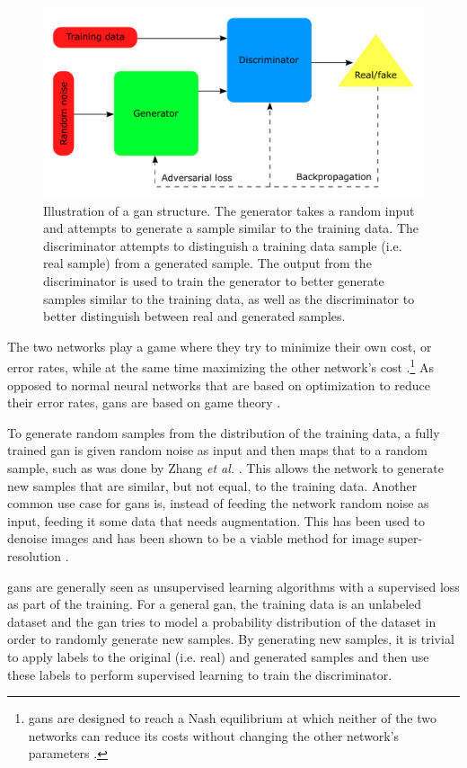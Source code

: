 \begin{figure}[htbp]  
    \centering
    \includegraphics[width=.8\textwidth]{figures/gan.pdf}
    \caption[Illustration of a GAN structure]{Illustration of a \gls{gan} structure. The generator takes a random input and attempts to generate a sample similar to the training data. The discriminator attempts to distinguish a training data sample (i.e. real sample) from a generated sample. The output from the discriminator is used to train the generator to better generate samples similar to the training data, as well as the discriminator to better distinguish between real and generated samples. }
    \label{fig:gan}
\end{figure}

The two networks play a game where they try to minimize their own cost, or error rates, while at the same time maximizing the other network's cost \cite{goodfellow2020gan}.\footnote{\gls{gan}s are designed to reach a Nash equilibrium at which neither of the two networks can reduce its costs without changing the other network's parameters \cite{liu2020tomogan}.} As opposed to normal neural networks that are based on optimization to reduce their error rates, \gls{gan}s are based on game theory \cite{goodfellow2020gan}. 

To generate random samples from the distribution of the training data, a fully trained \gls{gan} is given random noise as input and then maps that to a random sample, such as was done by Zhang \textit{et al.} \cite{zhangsagan}. This allows the network to generate new samples that are similar, but not equal, to the training data. Another common use case for \gls{gan}s is, instead of feeding the network random noise as input, feeding it some data that needs augmentation. This has been used to denoise images and has been shown to be a viable method for image super-resolution \cite{8710893,Ledig_2017_CVPR}. 

\glspl{gan} are generally seen as unsupervised learning algorithms with a supervised loss as part of the training. For a general \gls{gan}, the training data is an unlabeled dataset and the \gls{gan} tries to model a probability distribution of the dataset in order to randomly generate new samples. By generating new samples, it is trivial to apply labels to the original (i.e. real) and generated samples and then use these labels to perform supervised learning to train the discriminator. 

